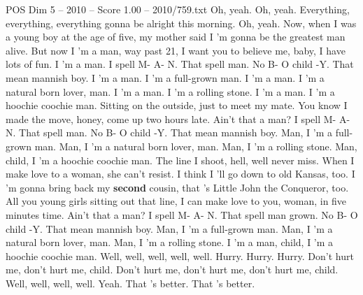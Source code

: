 \begin{textsample}{POS Dim 5 – 2010 – Score 1.00 – 2010/759.txt}  \label{ex:f5_pos_040}
Oh, yeah.
Oh, yeah.
Everything, everything, everything gonna be alright this morning.
Oh, yeah.
Now, when I was a young boy at the age of five, my mother said I 'm gonna be the greatest man alive.
But now I 'm a man, way past 21, I want you to believe me, baby, I have lots of fun.
I 'm a man.
I spell M- A- N.
That spell man.
No B- O child -Y.
That mean mannish boy.
I 'm a man.
I 'm a full-grown man.
I 'm a man.
I 'm a natural born lover, man.
I 'm a man.
I 'm a rolling stone.
I 'm a man.
I 'm a hoochie coochie man.
Sitting on the outside, just to meet my mate.
You know I made the move, honey, come up two hours late.
Ain't that a man?
I spell M- A- N.
That spell man.
No B- O child -Y.
That mean mannish boy.
Man, I 'm a full-grown man.
Man, I 'm a natural born lover, man.
Man, I 'm a rolling stone.
Man, child, I 'm a hoochie coochie man.
The line I shoot, hell, well never miss.
When I make love to a woman, she can't resist.
I think I 'll go down to old Kansas, too.
I 'm gonna bring back my \textbf{second} cousin, that 's Little John the Conqueror, too.
All you young girls sitting out that line, I can make love to you, woman, in five minutes time.
Ain't that a man?
I spell M- A- N.
That spell man grown.
No B- O child -Y.
That mean mannish boy.
Man, I 'm a full-grown man.
Man, I 'm a natural born lover, man.
Man, I 'm a rolling stone.
I 'm a man, child, I 'm a hoochie coochie man.
Well, well, well, well, well.
Hurry.
Hurry.
Hurry.
Don't hurt me, don't hurt me, child.
Don't hurt me, don't hurt me, don't hurt me, child.
Well, well, well, well.
Yeah.
That 's better.
That 's better.

\end{textsample}
